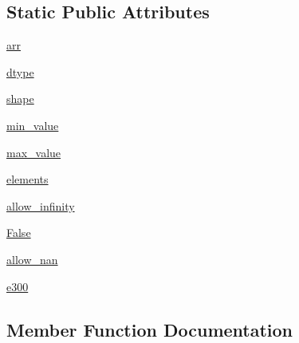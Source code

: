 \subsection*{Static Public Attributes}
\begin{DoxyCompactItemize}
\item 
\hyperlink{classnumpy_1_1lib_1_1tests_1_1test__function__base_1_1TestQuantile_a5a1c9aa6d7af7cdee5f3c7226bc15b9a}{arr}
\item 
\hyperlink{classnumpy_1_1lib_1_1tests_1_1test__function__base_1_1TestQuantile_a71fcefd261ac60a4a2b7c68cd7aa008e}{dtype}
\item 
\hyperlink{classnumpy_1_1lib_1_1tests_1_1test__function__base_1_1TestQuantile_acb16aa2c9edea618040cd5bd9d59a7c7}{shape}
\item 
\hyperlink{classnumpy_1_1lib_1_1tests_1_1test__function__base_1_1TestQuantile_aba16fb16cb4e6c4e50ed9ad13588c502}{min\+\_\+value}
\item 
\hyperlink{classnumpy_1_1lib_1_1tests_1_1test__function__base_1_1TestQuantile_a833fc2860ffea682a6d18ccf9e0eb287}{max\+\_\+value}
\item 
\hyperlink{classnumpy_1_1lib_1_1tests_1_1test__function__base_1_1TestQuantile_aadcb23e9d56d5cfe7411ee3e4540b661}{elements}
\item 
\hyperlink{classnumpy_1_1lib_1_1tests_1_1test__function__base_1_1TestQuantile_a0427f60ed1bc32c63b31a82b0dc95a20}{allow\+\_\+infinity}
\item 
\hyperlink{classnumpy_1_1lib_1_1tests_1_1test__function__base_1_1TestQuantile_ac099808a03928c1321497f310059aa1f}{False}
\item 
\hyperlink{classnumpy_1_1lib_1_1tests_1_1test__function__base_1_1TestQuantile_aa7abf7980458046c378c4797a47ca3a0}{allow\+\_\+nan}
\item 
\hyperlink{classnumpy_1_1lib_1_1tests_1_1test__function__base_1_1TestQuantile_af13e85983e810cfd2bab55d1979a0f91}{e300}
\end{DoxyCompactItemize}


\subsection{Member Function Documentation}
\mbox{\label{classnumpy_1_1lib_1_1tests_1_1test__function__base_1_1TestQuantile_ad60adf57994448247052e48abcdd83a8}} 
